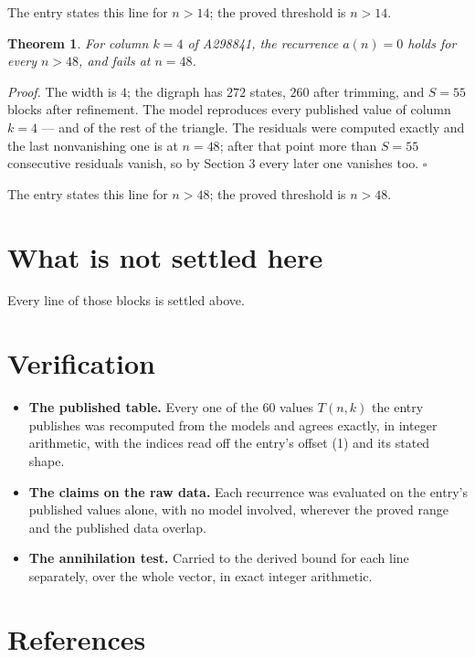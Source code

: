 \documentclass[11pt]{article}
\newtheorem{theorem}{Theorem}
\theoremstyle{definition}
\begin{document}
The entry states this line for $n > 14$; the proved threshold is $n > 14$.

\begin{theorem} For column $k = 4$ of A298841, the recurrence $a(n) = 0$ holds for every $n > 48$, and fails at $n = 48$.\end{theorem}

{\itshape Proof.} The width is $4$; the digraph has $272$ states, $260$ after trimming, and $S = 55$ blocks after refinement. The model reproduces every published value of column $k = 4$ --- and of the rest of the triangle. The residuals were computed exactly and the last nonvanishing one is at $n = 48$; after that point more than $S = 55$ consecutive residuals vanish, so by Section 3 every later one vanishes too. $\square$

The entry states this line for $n > 48$; the proved threshold is $n > 48$.

\section{What is not settled here}

Every line of those blocks is settled above.

\section{Verification}

\begin{itemize}

\item {\bfseries The published table.} Every one of the 60 values $T(n,k)$ the entry publishes was recomputed from the models and agrees exactly, in integer arithmetic, with the indices read off the entry's offset (1) and its stated shape.

\item {\bfseries The claims on the raw data.} Each recurrence was evaluated on the entry's published values alone, with no model involved, wherever the proved range and the published data overlap.

\item {\bfseries The annihilation test.} Carried to the derived bound for each line separately, over the whole vector, in exact integer arithmetic.

\end{itemize}

\section{References}
\end{document}
